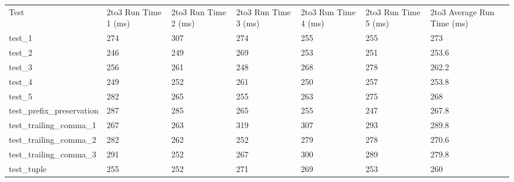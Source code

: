 \begin{table}[h]
    \begin{tabular}{@{}l|llllll@{}}
    \cmidrule(r){1-6}
    Test                                  & 2to3 Run Time 1 (ms) & 2to3 Run Time 2 (ms) & 2to3 Run Time 3 (ms) & 2to3 Run Time 4 (ms) & 2to3 Run Time 5 (ms) & 2to3 Average Run Time (ms) \\ \cmidrule(r){1-6}
    test\_1                               & 274                  & 307                  & 274                  & 255                  & 255                  & 273                        \\
    test\_2                               & 246                  & 249                  & 269                  & 253                  & 251                  & 253.6                      \\
    test\_3                               & 256                  & 261                  & 248                  & 268                  & 278                  & 262.2                      \\ \cmidrule(r){1-6}
    test\_4                               & 249                  & 252                  & 261                  & 250                  & 257                  & 253.8                      \\
    test\_5                               & 282                  & 265                  & 255                  & 263                  & 275                  & 268                        \\
    test\_prefix\_preservation            & 287                  & 285                  & 265                  & 255                  & 247                  & 267.8                      \\
    test\_trailing\_comma\_1              & 267                  & 263                  & 319                  & 307                  & 293                  & 289.8                      \\
    test\_trailing\_comma\_2              & 282                  & 262                  & 252                  & 279                  & 278                  & 270.6                      \\
    test\_trailing\_comma\_3              & 291                  & 252                  & 267                  & 300                  & 289                  & 279.8                      \\
    test\_tuple                           & 255                  & 252                  & 271                  & 269                  & 253                  & 260                        \\

\end{tabular}
\end{table}
